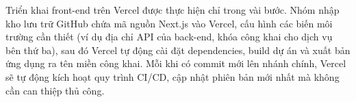 Triển khai front-end trên Vercel được thực hiện chỉ trong vài bước. Nhóm nhập kho lưu trữ GitHub chứa mã nguồn Next.js vào Vercel, cấu hình các biến môi trường cần thiết (ví dụ địa chỉ API của back-end, khóa công khai cho dịch vụ bên thứ ba), sau đó Vercel tự động cài đặt dependencies, build dự án và xuất bản ứng dụng ra tên miền công khai. Mỗi khi có commit mới lên nhánh chính, Vercel sẽ tự động kích hoạt quy trình CI/CD, cập nhật phiên bản mới nhất mà không cần can thiệp thủ công. \\